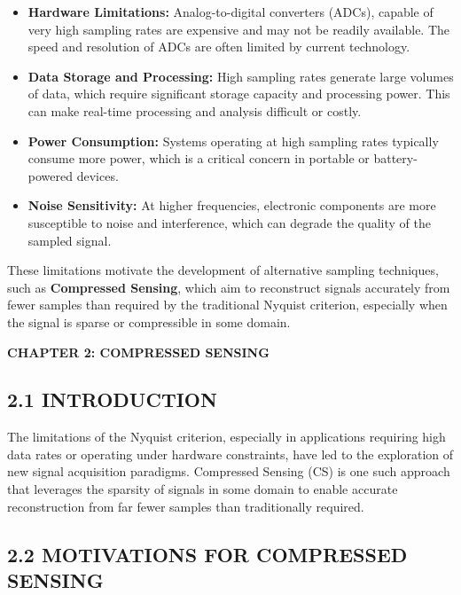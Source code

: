 \documentclass[
  letterpaper,
  DIV=11,
  numbers=noendperiod]{scrartcl}
\providecommand{\tightlist}{%
  \setlength{\itemsep}{0pt}\setlength{\parskip}{0pt}}
\providecommand{\mainsection}[1]{\begin{center}{\rmfamily\textbf{\fontsize{14}{20}\selectfont #1}}\end{center}}
\begin{document}
\begin{itemize}
\tightlist
\item
  \textbf{Hardware Limitations:} Analog-to-digital converters (ADCs),
  capable of very high sampling rates are expensive and may not be
  readily available. The speed and resolution of ADCs are often limited
  by current technology.
\item
  \textbf{Data Storage and Processing:} High sampling rates generate
  large volumes of data, which require significant storage capacity and
  processing power. This can make real-time processing and analysis
  difficult or costly.
\item
  \textbf{Power Consumption:} Systems operating at high sampling rates
  typically consume more power, which is a critical concern in portable
  or battery-powered devices.
\item
  \textbf{Noise Sensitivity:} At higher frequencies, electronic
  components are more susceptible to noise and interference, which can
  degrade the quality of the sampled signal.
\end{itemize}

These limitations motivate the development of alternative sampling
techniques, such as \textbf{Compressed Sensing}, which aim to
reconstruct signals accurately from fewer samples than required by the
traditional Nyquist criterion, especially when the signal is sparse or
compressible in some domain.

\newpage

\mainsection{CHAPTER 2: COMPRESSED SENSING}

\subsection{2.1 INTRODUCTION}\label{introduction-1}

The limitations of the Nyquist criterion, especially in applications
requiring high data rates or operating under hardware constraints, have
led to the exploration of new signal acquisition paradigms. Compressed
Sensing (CS) is one such approach that leverages the sparsity of signals
in some domain to enable accurate reconstruction from far fewer samples
than traditionally required.

\subsection{2.2 MOTIVATIONS FOR COMPRESSED
SENSING}\label{motivations-for-compressed-sensing}
\end{document}
